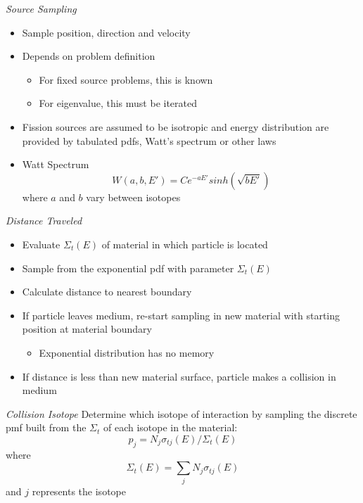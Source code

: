 \emph{Source Sampling}
   \begin{itemize}
      \item Sample position, direction and velocity
      
      \item Depends on problem definition
      \begin{itemize}
        \item For fixed source problems, this is known
        \item For eigenvalue, this must be iterated
      \end{itemize}
      
      \item Fission sources are assumed to be isotropic and energy distribution are provided by tabulated pdfs, Watt's spectrum or other laws
      
      \item Watt Spectrum
      \begin{equation*}
          W(a,b,E') = Ce^{-aE'}sinh(\sqrt{bE'})
      \end{equation*}
      where $a$ and $b$ vary between isotopes
   \end{itemize}


\emph{Distance Traveled}
   \begin{itemize}
       \item Evaluate $\Sigma_t(E)$ of material in which particle is located
       
       \item Sample from the exponential pdf with parameter $\Sigma_{t}(E)$
       
       \item Calculate distance to nearest boundary
       
       \item If particle leaves medium, re-start sampling in new material with starting position at material boundary
       \begin{itemize}
            \item Exponential distribution has no memory
       \end{itemize}
       
       \item If distance is less than new material surface, particle makes a collision in medium
   \end{itemize}


\emph{Collision Isotope}
  Determine which isotope of interaction by sampling the discrete pmf 
  built from the $\Sigma_t$ of each isotope in the material:
  \begin{equation*}
       p_{j} = N_{j}\sigma_{tj}(E) / \Sigma_{t}(E)
  \end{equation*}
  where
  \begin{equation*}
        \Sigma_{t}(E) = \sum_{j} N_{j}\sigma_{tj}(E)
  \end{equation*}  
  and $j$ represents the isotope


